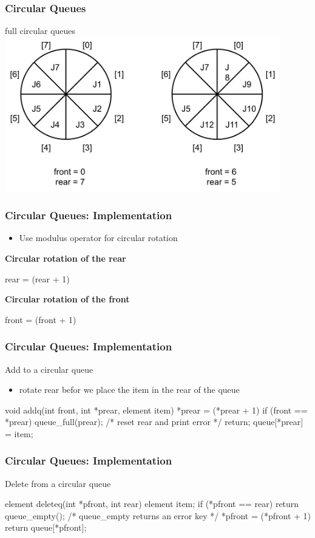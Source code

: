\documentclass[newPxFont,sthlmFooter,nooffset]{beamer}
\begin{document}
\begin{frame}[t]
  \frametitle{Circular Queues}
full circular queues
\includegraphics[width=0.9\textwidth]{figures/fig05_fcq.png}
\end{frame}

\begin{frame}[t, fragile]
  \frametitle{Circular Queues: Implementation}
  \begin{itemize}
  \item Use modulus operator for circular rotation
  \end{itemize}
\bigskip
\textbf{Circular rotation of the rear}
\begin{codedef}
rear = (rear + 1) %
\end{codedef}

\textbf{Circular rotation of the front}
\begin{codedef}
front = (front + 1) %
\end{codedef}
\end{frame}

\begin{frame}[t, fragile]
  \frametitle{Circular Queues: Implementation}
Add to a circular queue
\begin{itemize}
\item rotate rear befor we place the item in the rear of the queue
\end{itemize}

\begin{ncodedef}
void addq(int front, int *prear, element item){
    *prear = (*prear + 1)  %
    if (front == *prear) {
        queue_full(prear);
            /* reset rear and print error */
        return;
    }
    queue[*prear] = item;
}
\end{ncodedef}
\end{frame}

\begin{frame}[t, fragile]
  \frametitle{Circular Queues: Implementation}
Delete from a circular queue

\begin{ncodedef}
element deleteq(int *pfront, int rear){
    element item;
    if (*pfront == rear)
        return queue_empty();
        /* queue_empty returns an error key */
    *pfront = (*pfront + 1) %
    return queue[*pfront];
}
\end{ncodedef}
\end{frame}
\end{document}
